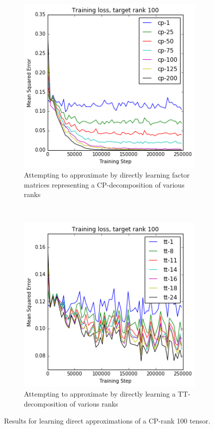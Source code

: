 {\begin{figure}
\centering
\begin{subfigure}[t]{0.45\textwidth}
	\includegraphics[width=\textwidth]{tensors/cp100cpapprox}
	\caption{Attempting to approximate by directly learning factor matrices representing a 
		CP-decomposition of various ranks}
	\label{fig:cpcpapprox}
\end{subfigure}
~
\begin{subfigure}[t]{0.45\textwidth}
	\includegraphics[width=\textwidth]{tensors/cp100ttapprox}
	\caption{Attempting to approximate by directly learning a TT-decomposition of various ranks}
	\label{fig:cpttapprox}
\end{subfigure}
\caption{Results for learning direct approximations of a CP-rank 100 tensor.}
 \label{fig:cpapprox}
\end{figure}

}
